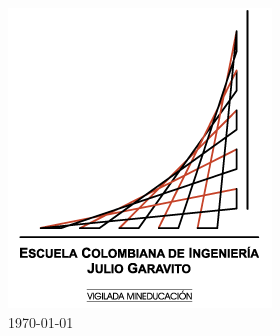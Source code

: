\documentclass[
11pt, %
oneside, %
spanish, %
singlespacing, %
headsepline, %
]{MastersDoctoralThesis} %
\begin{document}
\begin{titlepage}
\begin{center}
\vfill

\includegraphics[scale=0.4]{University/escuela-logo.png}\\ %
{\large \textrm{\today}}\\%
 
\vfill
\end{center}
\end{titlepage}



 
\end{document}
